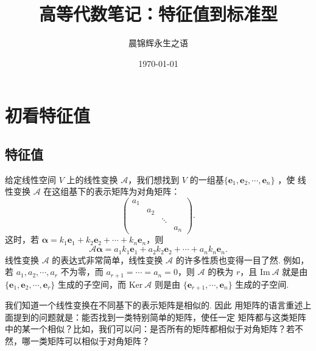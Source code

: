 \documentclass[12pt, a4paper]{ctexart}
\title{\textbf{高等代数笔记：特征值到标准型}}
\author{晨锦辉永生之语}
\date{\today}
\begin{document}
\maketitle
\tableofcontents
\newpage
\section{初看特征值}
\subsection{特征值}
给定线性空间 $V$ 上的线性变换 $\mathcal A$，我们想找到 $V$ 的一组基$\{\bm e_1, \bm e_2, \cdots, \bm e_n\}$ ，使
线性变换 $\mathcal A$ 在这组基下的表示矩阵为对角矩阵：
\[
\begin{pmatrix}
	a_1 & & & \\
	& a_2 & & \\
	& & \ddots & \\
	& & & a_n
\end{pmatrix}.
\]
这时，若 $\bm\alpha = k_1\bm e_1 + k_2\bm e_2 + \cdots + k_n\bm e_n$，则
\[
\mathcal A\bm\alpha = a_1k_1\bm e_1 + a_2k_2\bm e_2 + \cdots + a_nk_n\bm e_n.
\]
线性变换 $\mathcal A$ 的表达式非常简单，线性变换 $\mathcal A$ 的许多性质也变得一目了然. 例如，
若 $a_1, a_2, \cdots, a_r$ 不为零，而 $a_{r+1} = \cdots = a_n = 0$，则 $\mathcal A$ 的秩为 $r$，且 $\text{Im}\ \mathcal A$ 就是由
$\{\bm e_1, \bm e_2, \cdots, \bm e_r\}$ 生成的子空间，而 $\text{Ker}\ \mathcal A$ 则是由 $\{\bm e_{r+1}, \cdots, \bm e_n\}$ 生成的子空间. 

我们知道一个线性变换在不同基下的表示矩阵是相似的. 因此
用矩阵的语言重述上面提到的问题就是：能否找到一类特别简单的矩阵，使任一定
矩阵都与这类矩阵中的某一个相似？比如，我们可以问：是否所有的矩阵都相似于对角矩阵？若不然，哪一类矩阵可以相似于对角矩阵？
\end{document}
